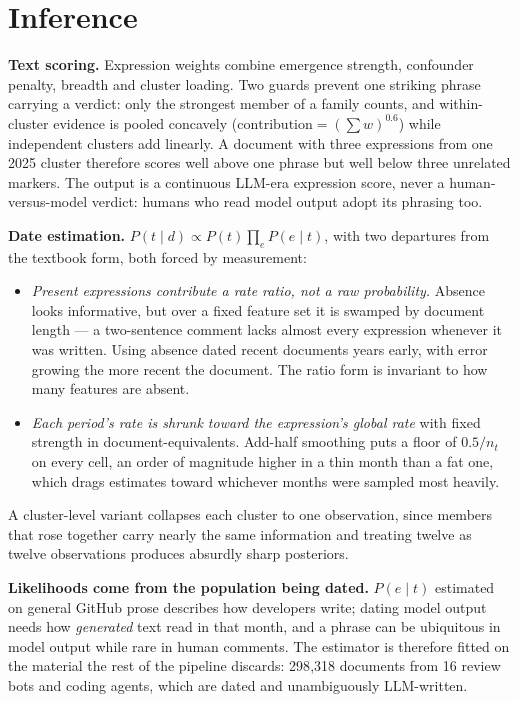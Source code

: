 \documentclass[11pt,a4paper]{article}
\begin{document}
\section{Inference}

\textbf{Text scoring.} Expression weights combine emergence strength, confounder
penalty, breadth and cluster loading. Two guards prevent one striking phrase carrying
a verdict: only the strongest member of a family counts, and within-cluster evidence
is pooled concavely ($\text{contribution}=(\sum w)^{0.6}$) while independent clusters
add linearly. A document with three expressions from one 2025 cluster therefore
scores well above one phrase but well below three unrelated markers. The output is a
continuous LLM-era expression score, never a human-versus-model verdict: humans who
read model output adopt its phrasing too.

\textbf{Date estimation.} $P(t\mid d)\propto P(t)\prod_e P(e\mid t)$, with two
departures from the textbook form, both forced by measurement:

\begin{itemize}
  \item \emph{Present expressions contribute a rate ratio, not a raw probability.}
  Absence looks informative, but over a fixed feature set it is swamped by document
  length --- a two-sentence comment lacks almost every expression whenever it was
  written. Using absence dated recent documents years early, with error growing the
  more recent the document. The ratio form is invariant to how many features are
  absent.
  \item \emph{Each period's rate is shrunk toward the expression's global rate} with
  fixed strength in document-equivalents. Add-half smoothing puts a floor of
  $0.5/n_t$ on every cell, an order of magnitude higher in a thin month than a fat
  one, which drags estimates toward whichever months were sampled most heavily.
\end{itemize}

A cluster-level variant collapses each cluster to one observation, since members that
rose together carry nearly the same information and treating twelve as twelve
observations produces absurdly sharp posteriors.

\textbf{Likelihoods come from the population being dated.} $P(e\mid t)$ estimated on
general GitHub prose describes how developers write; dating model output needs how
\emph{generated} text read in that month, and a phrase can be ubiquitous in model
output while rare in human comments. The estimator is therefore fitted on the material
the rest of the pipeline discards: 298{,}318 documents from 16 review bots and coding
agents, which are dated and unambiguously LLM-written.
\end{document}
